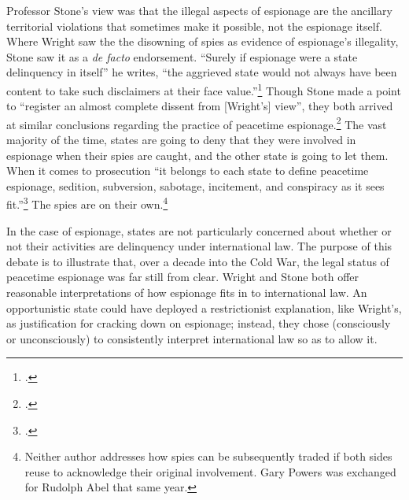 \documentclass[11pt]{memoir}
\begin{document}
\begin{refsegment}

Professor Stone's view was that the illegal aspects of espionage are the ancillary territorial violations that sometimes make it possible, not the espionage itself. Where Wright saw the the disowning of spies as evidence of espionage's illegality, Stone saw it as a \emph{de facto} endorsement. ``Surely if espionage were a state delinquency in itself'' he writes, ``the aggrieved state would not always have been content to take such disclaimers at their face value.''\footcite[p.~33]{stone_legal_1962} Though Stone made a point to ``register an almost complete dissent from [Wright's] view'', they both arrived at similar conclusions regarding the practice of peacetime espionage.\footcite[p.~33]{stone_legal_1962} The vast majority of the time, states are going to deny that they were involved in espionage when their spies are caught, and the other state is going to let them. When it comes to prosecution ``it belongs to each state to define peacetime espionage, sedition, subversion, sabotage, incitement, and conspiracy as it sees fit.''\footcite[p.~4]{wright_espionage_1962} The spies are on their own.\footnote{Neither author addresses how spies can be subsequently traded if both sides reuse to acknowledge their original involvement. Gary Powers was exchanged for Rudolph Abel that same year.}


In the case of espionage, states are not particularly concerned about whether or not their activities are delinquency under international law. The purpose of this debate is to illustrate that, over a decade into the Cold War, the legal status of peacetime espionage was far still from clear. Wright and Stone both offer reasonable interpretations of how espionage fits in to international law. An opportunistic state could have deployed a restrictionist explanation, like Wright's, as justification for cracking down on espionage; instead, they chose (consciously or unconsciously) to consistently interpret international law so as to allow it.


\end{refsegment}
\end{document}
